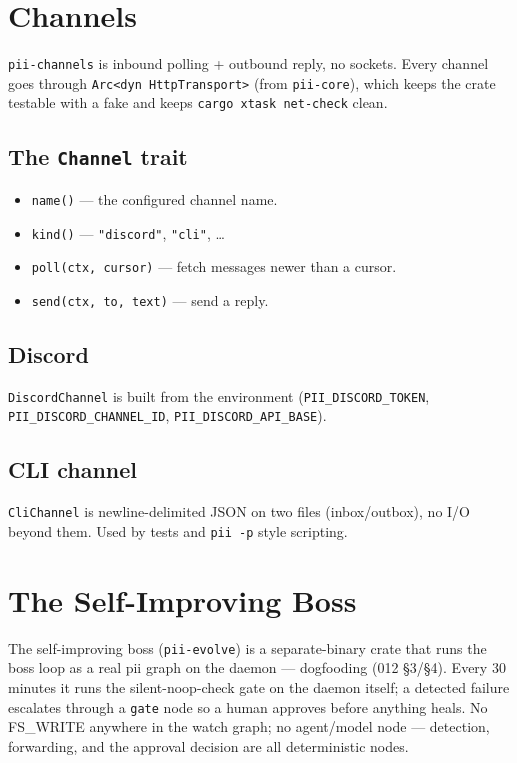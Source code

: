 \documentclass[
	fontsize=10pt,
	twoside=false,
	secnumdepth=2,
	open=any,
]{kaobook}
\begin{document}
\chapter{Channels}
\label{chap:channels}

\texttt{pii-channels} is inbound polling + outbound reply, no sockets.
Every channel goes through \texttt{Arc<dyn HttpTransport>} (from
\texttt{pii-core}), which keeps the crate testable with a fake and keeps
\texttt{cargo xtask net-check} clean.

\section{The \texttt{Channel} trait}

\begin{itemize}
    \item \texttt{name()} — the configured channel name.
    \item \texttt{kind()} — \texttt{"discord"}, \texttt{"cli"}, \ldots
    \item \texttt{poll(ctx, cursor)} — fetch messages newer than a cursor.
    \item \texttt{send(ctx, to, text)} — send a reply.
\end{itemize}

\section{Discord}

\texttt{DiscordChannel} is built from the environment
(\texttt{PII\_DISCORD\_TOKEN}, \texttt{PII\_DISCORD\_CHANNEL\_ID},
\texttt{PII\_DISCORD\_API\_BASE}).

\section{CLI channel}

\texttt{CliChannel} is newline-delimited JSON on two files (inbox/outbox),
no I/O beyond them. Used by tests and \texttt{pii -p} style scripting.

\chapter{The Self-Improving Boss}
\label{chap:evolve}

The self-improving boss (\texttt{pii-evolve}) is a separate-binary crate
that runs the boss loop as a real pii graph on the daemon — dogfooding
(012 \S3/\S4). Every 30 minutes it runs the silent-noop-check gate on the
daemon itself; a detected failure escalates through a \texttt{gate} node
so a human approves before anything heals. No FS\_WRITE anywhere in the
watch graph; no agent/model node — detection, forwarding, and the
approval decision are all deterministic nodes.
\end{document}
